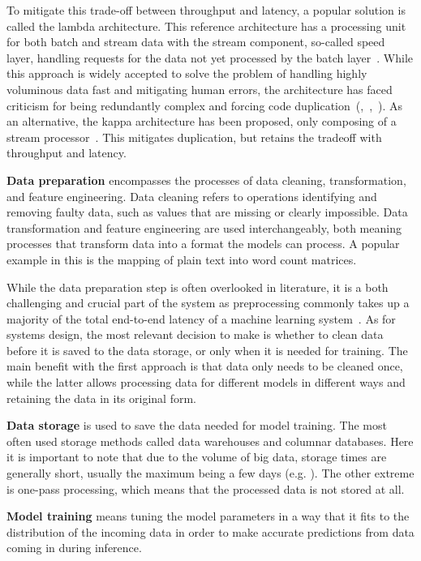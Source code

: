 To mitigate this trade-off between throughput and latency, a popular solution is called the lambda architecture. This reference architecture has a processing unit for both batch and stream data with the stream component, so-called speed layer, handling requests for the data not yet processed by the batch layer~\cite{beatingcap}. While this approach is widely accepted to solve the problem of handling highly voluminous data fast and mitigating human errors, the architecture has faced criticism for being redundantly complex and forcing code duplication~(\cite{questioninglambda},~\cite{uber},~\cite{facebook}). As an alternative, the kappa architecture has been proposed, only composing of a stream processor~\cite{questioninglambda}. This mitigates duplication, but retains the tradeoff with throughput and latency.

\textbf{Data preparation} encompasses the processes of data cleaning, transformation, and feature engineering. Data cleaning refers to operations identifying and removing faulty data, such as values that are missing or clearly impossible. Data transformation and feature engineering are used interchangeably, both meaning processes that transform data into a format the models can process. A popular example in this is the mapping of plain text into word count matrices.

While the data preparation step is often overlooked in literature,
it is a both challenging and crucial part of the system as preprocessing commonly takes up a majority of the total end-to-end latency of a machine learning system~\cite{adaptivelearningsystems}. As for systems design, the most relevant decision to make is whether to clean data before it is saved to the data storage, or only when it is  needed for training. The main benefit with the first approach is that data only needs to be cleaned once, while the latter allows processing data for different models in different ways and retaining the data in its original form.

\textbf{Data storage} is used to save the data needed for model training. The most often used storage methods called data warehouses and columnar databases. Here it is important to note that due to the volume of big data, storage times are generally short, usually the maximum being a few days (e.g. \cite{uber}). The other extreme is one-pass processing, which means that the processed data is not stored at all.

\textbf{Model training} means tuning the model parameters in a way that it fits to the distribution of the incoming data in order to make accurate predictions from data coming in during inference.

